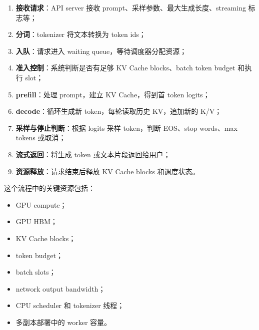 \begin{enumerate}
\item \textbf{接收请求}：API server 接收 prompt、采样参数、最大生成长度、streaming 标志等；
\item \textbf{分词}：tokenizer 将文本转换为 token ids；
\item \textbf{入队}：请求进入 waiting queue，等待调度器分配资源；
\item \textbf{准入控制}：系统判断是否有足够 KV Cache blocks、batch token budget 和执行 slot；
\item \textbf{prefill}：处理 prompt，建立 KV Cache，得到首 token logits；
\item \textbf{decode}：循环生成新 token，每轮读取历史 KV，追加新的 K/V；
\item \textbf{采样与停止判断}：根据 logits 采样 token，判断 EOS、stop words、max tokens 或取消；
\item \textbf{流式返回}：将生成 token 或文本片段返回给用户；
\item \textbf{资源释放}：请求结束后释放 KV Cache blocks 和调度状态。
\end{enumerate}

这个流程中的关键资源包括：

\begin{itemize}
\item GPU compute；
\item GPU HBM；
\item KV Cache blocks；
\item token budget；
\item batch slots；
\item network output bandwidth；
\item CPU scheduler 和 tokenizer 线程；
\item 多副本部署中的 worker 容量。
\end{itemize}

